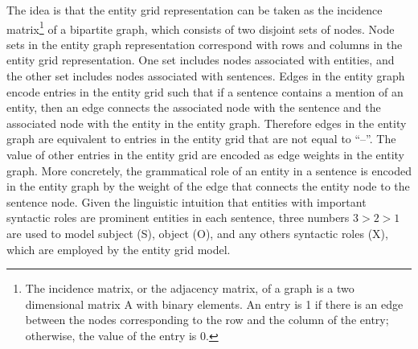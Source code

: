 The idea is that the entity grid representation can be taken as the incidence matrix\footnote{The incidence matrix, or the adjacency matrix, of a graph is a two dimensional matrix A with binary elements. An entry is 1 if there is an edge between the nodes corresponding to the row and the column of the entry; otherwise, the value of the entry is 0.} 
of a bipartite graph, which consists of two disjoint sets of nodes.  
Node sets in the entity graph representation correspond with rows and columns in the entity grid representation.  
One set includes nodes associated with entities, and the other set includes nodes associated with sentences.  
Edges in the entity graph encode entries in the entity grid such that if a sentence contains a mention of an entity, then an edge connects the associated node with the sentence and the associated node with the entity in the entity graph. 
Therefore edges in the entity graph are equivalent to entries in the entity grid that are not equal to ``--''. 
The value of other entries in the entity grid are encoded as edge weights in the entity graph. 
More concretely, the grammatical role of an entity in a sentence is encoded in the entity graph by the weight of the edge that connects the entity node to the sentence node. 
Given the linguistic intuition that entities with important syntactic roles are prominent entities in each sentence, three numbers $3>2>1$ are used to model subject (S), object (O), and any others syntactic roles (X), which are employed by the entity grid model. 

